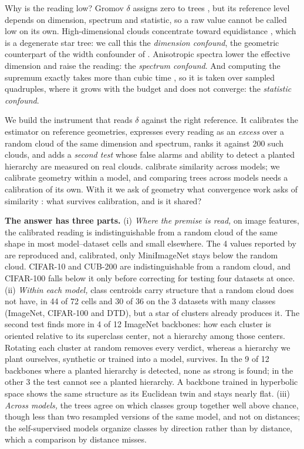 \documentclass{article}
\theoremstyle{inline}
\theoremstyle{inlineit}
\begin{document}
Why is the reading low? Gromov $\delta$ assigns zero to trees \citep{Gromov1987}, but its reference level depends on dimension, spectrum and statistic, so a raw value cannot be called low on its own. High-dimensional clouds concentrate toward equidistance \citep{beyer1999nearest, aggarwal2001surprising}, which is a degenerate star tree: we call this the \emph{dimension confound}, the geometric counterpart of the width confounder of \citet{groger2026aristotelian}. Anisotropic spectra lower the effective dimension and raise the reading: the \emph{spectrum confound}. And computing the supremum exactly takes more than cubic time \citep{fournier2015computing}, so it is taken over sampled quadruples, where it grows with the budget and does not converge: the \emph{statistic confound}.

We build the instrument that reads $\delta$ against the right reference. It calibrates the estimator on reference geometries, expresses every reading as an \emph{excess} over a random cloud of the same dimension and spectrum, ranks it against 200 such clouds, and adds a \emph{second test} whose false alarms and ability to detect a planted hierarchy are measured on real clouds. \citet{groger2026aristotelian} calibrate similarity across models; we calibrate geometry within a model, and comparing trees across models needs a calibration of its own. With it we ask of geometry what convergence work asks of similarity \citep{huh2024platonic, groger2026aristotelian}: what survives calibration, and is it shared?

\textbf{The answer has three parts.} (i) \emph{Where the premise is read,} on image features, the calibrated reading is indistinguishable from a random cloud of the same shape in most model--dataset cells and small elsewhere. The 4 values reported by \citet{Khrulkov_2020_CVPR} are reproduced and, calibrated, only MiniImageNet stays below the random cloud. CIFAR-10 and CUB-200 are indistinguishable from a random cloud, and CIFAR-100 falls below it only before correcting for testing four datasets at once. (ii) \emph{Within each model,} class centroids carry structure that a random cloud does not have, in 44 of 72 cells and 30 of 36 on the 3 datasets with many classes (ImageNet, CIFAR-100 and DTD), but a star of clusters already produces it. The second test finds more in 4 of 12 ImageNet backbones: how each cluster is oriented relative to its superclass center, not a hierarchy among those centers. Rotating each cluster at random removes every verdict, whereas a hierarchy we plant ourselves, synthetic or trained into a model, survives. In the 9 of 12 backbones where a planted hierarchy is detected, none as strong is found; in the other 3 the test cannot see a planted hierarchy. A backbone trained in hyperbolic space shows the same structure as its Euclidean twin and stays nearly flat. (iii) \emph{Across models,} the trees agree on which classes group together well above chance, though less than two resampled versions of the same model, and not on distances; the self-supervised models organize classes by direction rather than by distance, which a comparison by distance misses.
\end{document}
